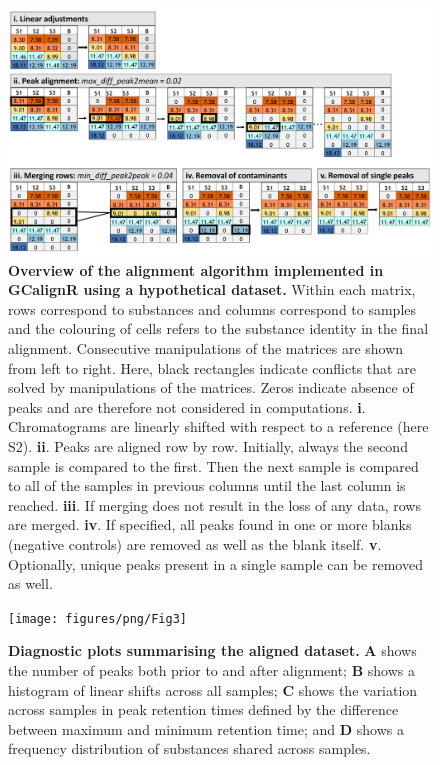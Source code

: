 \documentclass[10pt,letterpaper]{article}
\begin{document}
\newpage
\begin{figure}[htbp]
\centering
\includegraphics[width = 14cm]{figures/png/Fig2}
\caption{\textbf{Overview of the alignment algorithm implemented in GCalignR using a hypothetical dataset.}
Within each matrix, rows correspond to substances and columns correspond to samples and the colouring of cells refers to the substance identity in the final alignment. Consecutive manipulations of the matrices are shown from left to right. Here, black rectangles indicate conflicts that are solved by manipulations of the matrices. Zeros indicate absence of peaks and are therefore not considered in computations. \textbf{i}. Chromatograms are linearly shifted with respect to a reference (here S2).  \textbf{ii}. Peaks are aligned row by row. Initially, always the second sample is compared to the first. Then the next sample is compared to all of the samples in previous columns until the last column is reached. \textbf{iii}. If merging does not result in the loss of any data, rows are merged. \textbf{iv}. If specified, all peaks found in one or more blanks (negative controls) are removed as well as the blank itself. \textbf{v}. Optionally, unique peaks present in a single sample can be removed as well.}
\label{Fig:Fig2}
\end{figure}

\newpage
\begin{figure}[htbp]
\centering
\texttt{[image: figures/png/Fig3]}
\caption{\textbf{Diagnostic plots summarising the aligned dataset.}
\textbf{A} shows the number of peaks both prior to and after alignment; \textbf{B} shows a histogram of linear shifts across all samples; \textbf{C} shows the variation across samples in peak retention times defined by the difference between maximum and minimum retention time; and \textbf{D} shows a frequency distribution of substances shared across samples.}
\label{Fig:Fig3}
\end{figure} 
\end{document}
